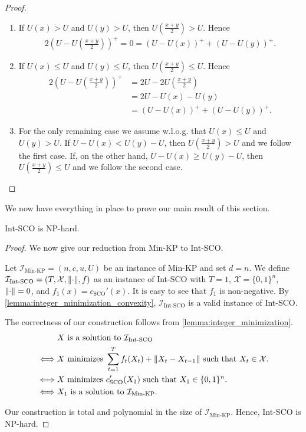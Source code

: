 \begin{proof}
\begin{enumerate}
    \item If $U(x) > U$ and $U(y) > U$, then $U\left(\frac{x+y}{2}\right) > U$. Hence \begin{align*}
        2\left(U - U\left(\frac{x+y}{2}\right)\right)^+ = 0 = (U - U(x))^+ + (U - U(y))^+.
    \end{align*}
    \item If $U(x) \leq U$ and $U(y) \leq U$, then $U\left(\frac{x+y}{2}\right) \leq U$. Hence \begin{align*}
        2\left(U - U\left(\frac{x+y}{2}\right)\right)^+ &= 2U - 2U\left(\frac{x+y}{2}\right) \\
                                                        &= 2U - U(x) - U(y) \\
                                                        &= (U - U(x))^+ + (U - U(y))^+.
    \end{align*}
    \item For the only remaining case we assume w.l.o.g. that $U(x) \leq U$ and $U(y) > U$. If $U - U(x) < U(y) - U$, then $U\left(\frac{x+y}{2}\right) > U$ and we follow the first case. If, on the other hand, $U - U(x) \geq U(y) - U$, then $U\left(\frac{x+y}{2}\right) \leq U$ and we follow the second case.\qedhere
\end{enumerate}
\end{proof}

We now have everything in place to prove our main result of this section.

\begin{theorem}
Int-SCO is NP-hard.
\end{theorem}
\begin{proof}
We now give our reduction from Min-KP to Int-SCO.

Let $\mathcal{I}_{\text{Min-KP}} = (n, c, u, U)$ be an instance of Min-KP and set $d = n$. We define $\mathcal{I}_{\text{Int-SCO}} = (T, \mathcal{X}, \lVert\cdot\rVert, f)$ as an instance of Int-SCO with $T = 1$, $\mathcal{X} = \{0,1\}^n$, $\lVert\cdot\rVert = 0$, and $f_1(x) = c_{\text{SCO}}'(x)$. It is easy to see that $f_1$ is non-negative. By \cref{lemma:integer_minimization_convexity}, $\mathcal{I}_{\text{Int-SCO}}$ is a valid instance of Int-SCO.

The correctness of our construction follows from \cref{lemma:integer_minimization}. \begin{align*}
         &X \text{ is a solution to } \mathcal{I}_{\text{Int-SCO}} \\
    \iff &X \text{ minimizes } \sum_{t=1}^T f_t(X_t) + \lVert X_t - X_{t-1}\rVert \text{ such that } X_t \in \mathcal{X}. \\
    \iff &X \text{ minimizes } c_{\text{SCO}}'(X_1) \text{ such that } X_1 \in \{0,1\}^n. \\
    \iff &X_1 \text{ is a solution to } \mathcal{I}_{\text{Min-KP}}.
\end{align*}

Our construction is total and polynomial in the size of $\mathcal{I}_{\text{Min-KP}}$. Hence, Int-SCO is NP-hard.
\end{proof}

